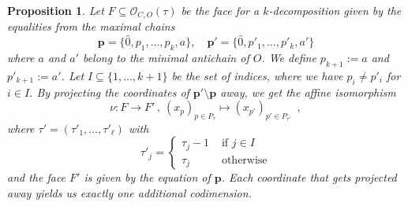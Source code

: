 \documentclass[12pt,a4paper]{amsart}
\newtheorem{proposition}[theorem]{Proposition}
\theoremstyle{definition}
\newcommand{\OP}{\mathcal{O}}
\begin{document}
\begin{proposition}\label{Proposition-Chains-Codimension}
    Let $F\subseteq\OP_{C,O}(\tau)$ be the face for a $k$-decomposition given by the equalities from the maximal chains
\begin{equation*}
    \mathbf{p}=\{\hat{0},p_1,\dots,p_k,a\},\hspace{1em}\mathbf{p'}=\{\hat{0},p'_1,\dots,p'_k,a'\}
\end{equation*}
where $a$ and $a'$ belong to the minimal antichain of $O$. 
We define $p_{k+1}:= a$ and $p'_{k+1}:= a'$. 
Let $I\subseteq\{1,\dots, k+1\}$ be the set of indices, where we have $p_i\neq p'_i$ for $i\in I$.
By projecting the coordinates of $\mathbf{p}'\setminus\mathbf{p}$ away, we get the affine isomorphism
\[
  \nu:F\rightarrow F' \,,\ (x_{p})_{p\in P_\tau}\mapsto (x_{p'})_{p'\in P_{\tau'}} \enspace ,
\]
where $\tau'=(\tau'_1,\dots,\tau'_\ell)$ with
\begin{equation*}
    \tau'_j=\begin{cases}
        \tau_j-1&\text{ if $j\in I$}\\
        \tau_j&\text{ otherwise}
    \end{cases}
\end{equation*}
and the face $F'$ is given by the equation of $\mathbf{p}$. Each coordinate that gets projected away yields us exactly one additional codimension.
\end{proposition}
\end{document}
